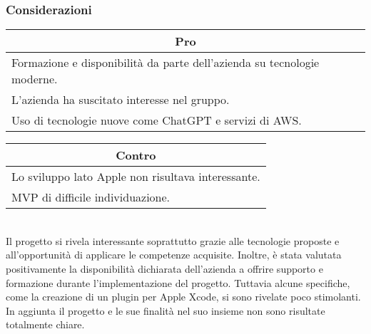 \subsubsection{Considerazioni}
\begin{minipage}[t]{0.45\linewidth}
    \vspace{0pt}
    {\renewcommand{\arraystretch}{1.5}
    \begin{tabular}{p{1\linewidth}}
        \multicolumn{1}{c}{\textbf{Pro}} \\
        \midrule
        Formazione e disponibilità da parte dell'azienda su tecnologie moderne. \\
        L'azienda ha suscitato interesse nel gruppo. \\
        Uso di tecnologie nuove come ChatGPT e servizi di AWS. \\
        \hline
    \end{tabular}
    }
\end{minipage}
\hspace{0.05\linewidth}
\begin{minipage}[t]{0.45\linewidth}
    \vspace{0pt}
    {\renewcommand{\arraystretch}{1.5}
    \begin{tabular}{p{1\linewidth}}
        \multicolumn{1}{c}{\textbf{Contro}} \\
        \midrule
        Lo sviluppo lato Apple non risultava interessante. \\
        MVP di difficile individuazione.\\
        \hline
    \end{tabular}
    }
\end{minipage}
\vspace{1em} \\
Il progetto si rivela interessante soprattutto grazie alle tecnologie proposte e all'opportunità di applicare le competenze acquisite. Inoltre, è stata valutata positivamente la disponibilità dichiarata dell'azienda a offrire supporto e formazione durante l'implementazione del progetto.
Tuttavia alcune specifiche, come la creazione di un plugin per Apple Xcode, si sono rivelate poco stimolanti. In aggiunta il progetto e le sue finalità nel suo insieme non sono risultate totalmente chiare.
